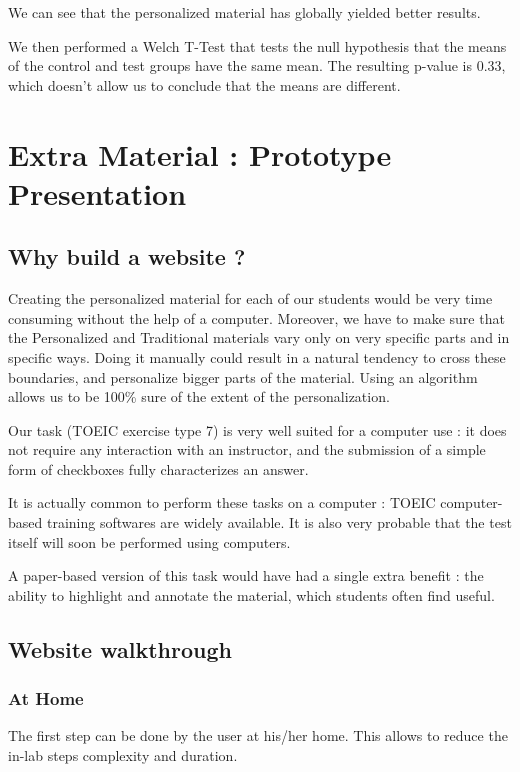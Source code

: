 \documentclass[a4paper,12pt]{article}
\begin{document}
We can see that the personalized material has globally yielded better results.

We then performed a Welch T-Test that tests the null hypothesis that the means of the control and test groups have the same mean. The resulting p-value is 0.33, which doesn't allow us to conclude that the means are different.


\section{Extra Material : Prototype Presentation}

\subsection{Why build a website ?}

Creating the personalized material for each of our students would be very time consuming without the help of a computer. Moreover, we have to make sure that the Personalized and Traditional materials vary only on very specific parts and in specific ways. Doing it manually could result in a natural tendency to cross these boundaries, and personalize bigger parts of the material. Using an algorithm allows us to be 100\% sure of the extent of the personalization.

Our task (TOEIC exercise type 7) is very well suited for a computer use : it does not require any interaction with an instructor, and the submission of a simple form of checkboxes fully characterizes an answer.

It is actually common to perform these tasks on a computer : TOEIC computer-based training softwares are widely available. It is also very probable that the test itself will soon be performed using computers.

A paper-based version of this task would have had a single extra benefit : the ability to highlight and annotate the material, which students often find useful.

\subsection{Website walkthrough}

\subsubsection{At Home}

The first step can be done by the user at his/her home. This allows to reduce the in-lab steps complexity and duration.
\end{document}
